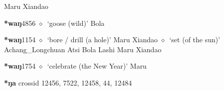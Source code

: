 \begin{list}{}{\leftmargin=1.5em \itemindent=-1.5em}
\hspace{1ex}
         Maru 
\hspace{1ex}
         Xiandao 
  \item {\footnotesize \textbf{*waŋ}}{\tiny 4856}
\hspace{1ex}
         $\diamond$~`goose (wild)'
         Bola 
  \item {\footnotesize \textbf{*waŋ}}{\tiny 1154}
\hspace{1ex}
         $\diamond$~`bore / drill (a hole)'
         Maru 
\hspace{1ex}
         Xiandao 
\hspace{1ex}
         $\diamond$~`set (of the sun)'
         Achang\_Longchuan 
\hspace{1ex}
         Atsi 
\hspace{1ex}
         Bola 
\hspace{1ex}
         Lashi 
\hspace{1ex}
         Maru 
\hspace{1ex}
         Xiandao 
  \item {\footnotesize \textbf{*waŋ}}{\tiny 1754}
\hspace{1ex}
         $\diamond$~`celebrate (the New Year)'
         Maru 
  \end{list}
\item
\textbf{*ŋa}
  {\tiny crossid 12456, 7522, 12458, 44, 12484}

